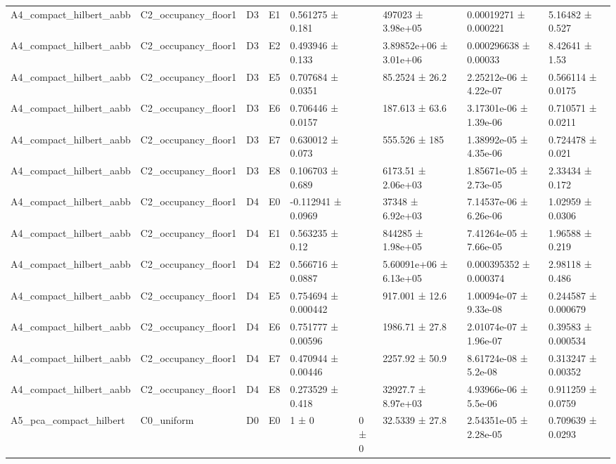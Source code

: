 \begin{table}
\begin{tabular}{lllllllll}
A4\_compact\_hilbert\_aabb & C2\_occupancy\_floor1 & D3 & E1 & 0.561275 ± 0.181 &  & 497023 ± 3.98e+05 & 0.00019271 ± 0.000221 & 5.16482 ± 0.527 \\
A4\_compact\_hilbert\_aabb & C2\_occupancy\_floor1 & D3 & E2 & 0.493946 ± 0.133 &  & 3.89852e+06 ± 3.01e+06 & 0.000296638 ± 0.00033 & 8.42641 ± 1.53 \\
A4\_compact\_hilbert\_aabb & C2\_occupancy\_floor1 & D3 & E5 & 0.707684 ± 0.0351 &  & 85.2524 ± 26.2 & 2.25212e-06 ± 4.22e-07 & 0.566114 ± 0.0175 \\
A4\_compact\_hilbert\_aabb & C2\_occupancy\_floor1 & D3 & E6 & 0.706446 ± 0.0157 &  & 187.613 ± 63.6 & 3.17301e-06 ± 1.39e-06 & 0.710571 ± 0.0211 \\
A4\_compact\_hilbert\_aabb & C2\_occupancy\_floor1 & D3 & E7 & 0.630012 ± 0.073 &  & 555.526 ± 185 & 1.38992e-05 ± 4.35e-06 & 0.724478 ± 0.021 \\
A4\_compact\_hilbert\_aabb & C2\_occupancy\_floor1 & D3 & E8 & 0.106703 ± 0.689 &  & 6173.51 ± 2.06e+03 & 1.85671e-05 ± 2.73e-05 & 2.33434 ± 0.172 \\
A4\_compact\_hilbert\_aabb & C2\_occupancy\_floor1 & D4 & E0 & -0.112941 ± 0.0969 &  & 37348 ± 6.92e+03 & 7.14537e-06 ± 6.26e-06 & 1.02959 ± 0.0306 \\
A4\_compact\_hilbert\_aabb & C2\_occupancy\_floor1 & D4 & E1 & 0.563235 ± 0.12 &  & 844285 ± 1.98e+05 & 7.41264e-05 ± 7.66e-05 & 1.96588 ± 0.219 \\
A4\_compact\_hilbert\_aabb & C2\_occupancy\_floor1 & D4 & E2 & 0.566716 ± 0.0887 &  & 5.60091e+06 ± 6.13e+05 & 0.000395352 ± 0.000374 & 2.98118 ± 0.486 \\
A4\_compact\_hilbert\_aabb & C2\_occupancy\_floor1 & D4 & E5 & 0.754694 ± 0.000442 &  & 917.001 ± 12.6 & 1.00094e-07 ± 9.33e-08 & 0.244587 ± 0.000679 \\
A4\_compact\_hilbert\_aabb & C2\_occupancy\_floor1 & D4 & E6 & 0.751777 ± 0.00596 &  & 1986.71 ± 27.8 & 2.01074e-07 ± 1.96e-07 & 0.39583 ± 0.000534 \\
A4\_compact\_hilbert\_aabb & C2\_occupancy\_floor1 & D4 & E7 & 0.470944 ± 0.00446 &  & 2257.92 ± 50.9 & 8.61724e-08 ± 5.2e-08 & 0.313247 ± 0.00352 \\
A4\_compact\_hilbert\_aabb & C2\_occupancy\_floor1 & D4 & E8 & 0.273529 ± 0.418 &  & 32927.7 ± 8.97e+03 & 4.93966e-06 ± 5.5e-06 & 0.911259 ± 0.0759 \\
A5\_pca\_compact\_hilbert & C0\_uniform & D0 & E0 & 1 ± 0 & 0 ± 0 & 32.5339 ± 27.8 & 2.54351e-05 ± 2.28e-05 & 0.709639 ± 0.0293 \\

\end{tabular}
\end{table}
